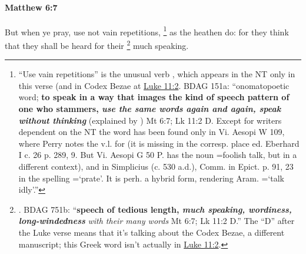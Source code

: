			\begin{framed}
			\scriptsize
				\begin{compactdesc}
					\item[SBLG] 
				\end{compactdesc}
			\end{framed}

		\paragraph{Matthew 6:7} %
			\label{MATTHEW-6-7}

			But when ye pray, use not vain repetitions,%
				\footnote{%
					``Use vain repetitions'' is the unusual verb , which appears in the NT only in this verse (and in Codex Bezae at \hyperref[LUKE-11-2]{Luke 11:2}. BDAG 151a: ``onomatopoetic word; \textbf{to speak in a way that images the kind of speech pattern of one who stammers, \textit{use the same words again and again, speak without thinking}} (explained by ) Mt 6:7; Lk 11:2 D. Except for writers dependent on the NT the word has been found only in Vi. Aesopi W 109, where Perry notes the v.l.  for  (it is missing in the corresp. place ed. Eberhard I c. 26 p. 289, 9. But Vi. Aesopi G 50 P. has the noun =foolish talk, but in a different context), and in Simplicius (c. 530 a.d.), Comm. in Epict. p. 91, 23 in the spelling =`prate'. It is perh. a hybrid form, rendering Aram. =`talk idly'.''
					}
			as the heathen do: for they think that they shall be heard for their
				\footnote{%
					. BDAG 751b: ``\textbf{speech of tedious length, \textit{much speaking, wordiness, long-windedness}}   \textit{with their many words} Mt 6:7; Lk 11:2 D.'' The ``D'' after the Luke verse means that it's talking about the Codex Bezae, a different manuscript; this Greek word isn't actually in \hyperref[LUKE-11-2]{Luke 11:2}.
					}%
			much speaking.

